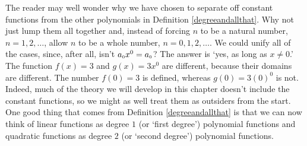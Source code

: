 
\smallskip

The reader may well wonder why we have chosen to separate off constant functions from the other polynomials in Definition \ref{degreeandallthat}.  Why not just lump them all together and, instead of forcing $n$ to be a natural number, $n = 1, 2, \ldots$, allow $n$ to be a whole number, $n = 0, 1, 2, \ldots$.  We could unify all of the cases, since, after all, isn't $a_{\mbox{\tiny $0$}}x^{0} = a_{\mbox{\tiny $0$}}$?  The answer is `yes, as long as $x\neq 0$.'  The function $f(x) = 3$ and $g(x) = 3x^{0}$ are different, because their domains are different.  The number $f(0) = 3$ is defined, whereas $g(0) = 3(0)^{0}$ is not.   \label{indeterminantformone} Indeed, much of the theory we will develop in this chapter doesn't include the constant functions, so we might as well treat them as outsiders from the start.  One good thing that comes from Definition \ref{degreeandallthat} is that we can now think of linear functions as degree $1$ (or `first degree') polynomial functions and quadratic functions as degree $2$ (or `second degree') polynomial functions.

